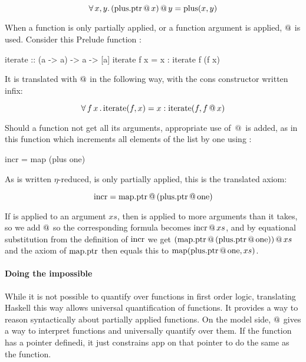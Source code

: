 \begin{equation*}
\forall \, x , y . \,  (\mathrm{plus.ptr} \, @ \, x) \, @ \, y = \mathrm{plus}(x,y)
\end{equation*}

When a function is only partially applied, or a function argument is
applied, $@$ is used. Consider this Prelude function :

\begin{code}
iterate :: (a -> a) -> a -> [a]
iterate f x = x : iterate f (f x)
\end{code}

It is translated with $@$ in the following way, with the cons
constructor \hs{:} written infix:

\begin{equation*}
\forall \, f \, x \, . \, \mathrm{iterate}(f,x) = x : \mathrm{iterate}(f,f \, @ \, x)
\end{equation*}

Should a function not get all its arguments, appropriate use of $\, @ \, $ is
added, as in this function which increments all elements of the list
by one using :

\begin{code}
incr = map (plus one)
\end{code}

As  is written $\eta$-reduced,  is
only partially applied, this is the translated axiom:

\begin{equation*}
\mathrm{incr} = \mathrm{map.ptr} \, @ \, (\mathrm{plus.ptr} \, @ \, \mathrm{one})
\end{equation*}

If  is applied to an argument $xs$, then  is applied
to more arguments than it takes, so we add $@$ so the
corresponding formula becomes $\mathrm{incr} \, @ \, xs$, and by equational
substitution from the definition of $\mathrm{incr}$ we get
$(\mathrm{map.ptr} \, @ \, (\mathrm{plus.ptr} \, @ \, \mathrm{one})) \, @ \, xs$ and
the axiom of $\mathrm{map.ptr}$ then equals this to
$\mathrm{map}(\mathrm{plus.ptr} \, @ \, \mathrm{one},xs)$.

\paragraph{Doing the impossible}
While it is not possible to quantify over functions in first order
logic, translating Haskell this way allows universal quantification of
functions.  It provides a way to reason syntactically about partially
applied functions. On the model side, $@$ gives a way to
interpret functions and universally quantify over them. If the
function has a pointer definedi, it just constrains app on that pointer
to do the same as the function.

